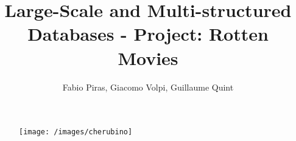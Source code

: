 

\author{Fabio Piras, Giacomo Volpi, Guillaume Quint}
\title{Large-Scale and Multi-structured Databases - Project: Rotten Movies}
\date{}

\begin{figure}
\centering
\texttt{[image: /images/cherubino]}

\end{figure}

\maketitle


\newpage

\tableofcontents























